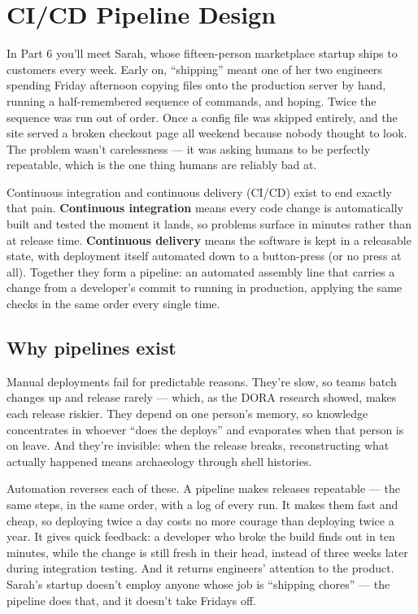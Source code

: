\section{CI/CD Pipeline Design}
In Part 6 you'll meet Sarah, whose fifteen-person marketplace startup ships to customers every week. Early on, ``shipping'' meant one of her two engineers spending Friday afternoon copying files onto the production server by hand, running a half-remembered sequence of commands, and hoping. Twice the sequence was run out of order. Once a config file was skipped entirely, and the site served a broken checkout page all weekend because nobody thought to look. The problem wasn't carelessness — it was asking humans to be perfectly repeatable, which is the one thing humans are reliably bad at.


Continuous integration and continuous delivery (CI/CD) exist to end exactly that pain. \textbf{Continuous integration} means every code change is automatically built and tested the moment it lands, so problems surface in minutes rather than at release time. \textbf{Continuous delivery} means the software is kept in a releasable state, with deployment itself automated down to a button-press (or no press at all). Together they form a pipeline: an automated assembly line that carries a change from a developer's commit to running in production, applying the same checks in the same order every single time.



\subsection{Why pipelines exist}


Manual deployments fail for predictable reasons. They're slow, so teams batch changes up and release rarely — which, as the DORA research showed, makes each release riskier. They depend on one person's memory, so knowledge concentrates in whoever ``does the deploys'' and evaporates when that person is on leave. And they're invisible: when the release breaks, reconstructing what actually happened means archaeology through shell histories.


Automation reverses each of these. A pipeline makes releases repeatable — the same steps, in the same order, with a log of every run. It makes them fast and cheap, so deploying twice a day costs no more courage than deploying twice a year. It gives quick feedback: a developer who broke the build finds out in ten minutes, while the change is still fresh in their head, instead of three weeks later during integration testing. And it returns engineers' attention to the product. Sarah's startup doesn't employ anyone whose job is ``shipping chores'' — the pipeline does that, and it doesn't take Fridays off.


